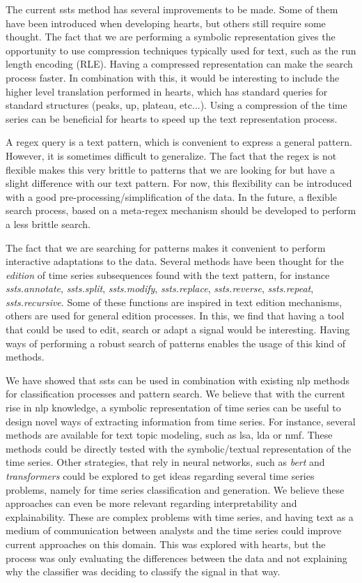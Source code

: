 The current \gls{ssts} method has several improvements to be made. Some of them have been introduced when developing \gls{hearts}, but others still require some thought. The fact that we are performing a symbolic representation gives the opportunity to use compression techniques typically used for text, such as the run length encoding (RLE). Having a compressed representation can make the search process faster. In combination with this, it would be interesting to include the higher level translation performed in \gls{hearts}, which has standard queries for standard structures (peaks, up, plateau, etc...). Using a compression of the time series can be beneficial for \gls{hearts} to speed up the text representation process.
\par
A \gls{regex} query is a text pattern, which is convenient to express a general pattern. However, it is sometimes difficult to generalize. The fact that the \gls{regex} is not flexible makes this very brittle to patterns that we are looking for but have a slight difference with our text pattern. For now, this flexibility can be introduced with a good pre-processing/simplification of the data. In the future, a flexible search process, based on a meta-regex mechanism should be developed to perform a less brittle search. 
\par
The fact that we are searching for patterns makes it convenient to perform interactive adaptations to the data. Several methods have been thought for the \textit{edition} of time series subsequences found with the text pattern, for instance \textit{ssts.annotate}, \textit{ssts.split}, \textit{ssts.modify}, \textit{ssts.replace}, \textit{ssts.reverse}, \textit{ssts.repeat}, \textit{ssts.recursive}. Some of these functions are inspired in text edition mechanisms, others are used for general edition processes. In this, we find that having a tool that could be used to edit, search or adapt a signal would be interesting. Having ways of performing a robust search of patterns enables the usage of this kind of methods.
\par
We have showed that \gls{ssts} can be used in combination with existing \gls{nlp} methods for classification processes and pattern search. We believe that with the current rise in \gls{nlp} knowledge, a symbolic representation of time series can be useful to design novel ways of extracting information from time series. For instance, several methods are available for text topic modeling, such as \gls{lsa}, \gls{lda} or \gls{nmf}. These methods could be directly tested with the symbolic/textual representation of the time series. Other strategies, that rely in neural networks, such as \textit{bert} and \textit{transformers} could be explored to get ideas regarding several time series problems, namely for time series classification and generation. We believe these approaches can even be more relevant regarding interpretability and explainability. These are complex problems with time series, and having text as a medium of communication between analysts and the time series could improve current approaches on this domain. This was explored with \gls{hearts}, but the process was only evaluating the differences between the data and not explaining why the classifier was deciding to classify the signal in that way.
